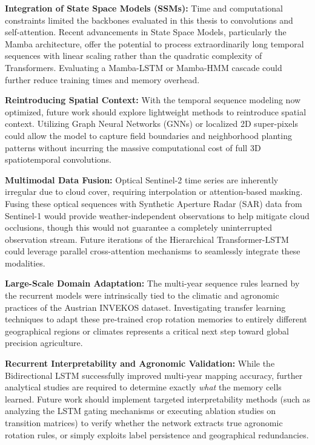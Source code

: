 \textbf{Integration of State Space Models (SSMs):}
Time and computational constraints limited the backbones evaluated in this thesis to convolutions and self-attention.
Recent advancements in State Space Models, particularly the Mamba architecture, offer the potential to process extraordinarily
long temporal sequences with linear scaling rather than the quadratic complexity of Transformers.
Evaluating a Mamba-LSTM or Mamba-HMM cascade could further reduce training times and memory overhead.

\textbf{Reintroducing Spatial Context:}
With the temporal sequence modeling now optimized, future work should explore lightweight methods to reintroduce spatial context.
Utilizing Graph Neural Networks (GNNs) or localized 2D super-pixels could allow the model to capture field boundaries and
neighborhood planting patterns without incurring the massive computational cost of full 3D spatiotemporal convolutions.

\textbf{Multimodal Data Fusion:}
Optical Sentinel-2 time series are inherently irregular due to cloud cover, requiring interpolation or attention-based masking.
Fusing these optical sequences with Synthetic Aperture Radar (SAR) data from Sentinel-1 would provide weather-independent
observations to help mitigate cloud occlusions, though this would not guarantee a completely uninterrupted observation stream.
Future iterations of the Hierarchical Transformer-LSTM could leverage parallel cross-attention mechanisms to seamlessly integrate these modalities.

\textbf{Large-Scale Domain Adaptation:}
The multi-year sequence rules learned by the recurrent models were intrinsically tied to the climatic
and agronomic practices of the Austrian INVEKOS dataset.
Investigating transfer learning techniques to adapt these pre-trained crop rotation memories to entirely different geographical regions or
climates represents a critical next step toward global precision agriculture.

\textbf{Recurrent Interpretability and Agronomic Validation:}
While the Bidirectional LSTM successfully improved multi-year mapping accuracy,
further analytical studies are required to determine exactly \textit{what} the memory cells learned.
Future work should implement targeted interpretability methods (such as analyzing the LSTM gating mechanisms or executing
ablation studies on transition matrices) to verify whether the network extracts true agronomic rotation rules,
or simply exploits label persistence and geographical redundancies.